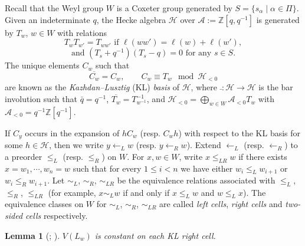 \documentclass[11pt, reqno]{amsart}
\newcommand{\al}{\alpha}
\newcommand{\mc}[1]{\mathcal{#1}}
\newcommand{\rar}{\rightarrow}
\newtheorem{lem}[Thm]{Lemma}
\theoremstyle{definition}
\numberwithin{equation}{section}
\begin{document}
Recall that the Weyl group $ W  $ is a Coxeter group generated by $ S=\{s_\al\mid\al\in\Pi \} $. Given an indeterminate $q$, the Hecke algebra $ \mc{H} $ over $ \mathcal{A} :=\mathbb{Z}[q,q^{-1}]$ is generated by $ T_w $, $ w\in W $ with relations \[
T_wT_{w'}=T_{ww'} \text{ if }\ell(ww')=\ell(w)+\ell(w'),
\]
\[
\text{and }(T_s+q^{-1})(T_s-q)=0 \text{ for any }s\in S.
\]
The unique elements $ C_w $ such that
\[
\overline{C_w}=C_w,\qquad C_w\equiv T_w \mod{\mc{H}_{<0}}
\]
are known as the \textit{Kazhdan--Lusztig} (KL) \textit{basis} of $ \mc{H} $, where $ \bar{\,} :\mc{H}\rar\mc{H}$ is the bar involution such that $ \bar{q}=q^{-1} $, $ \overline{T_w} =T_{w^{-1}}^{-1}$, and $ \mc{H}_{<0}=\bigoplus_{w\in W}\mathcal{A}_{<0}T_w $ with $ \mathcal{A}_{<0}=q^{-1}\mathbb{Z}[q^{-1}] $.

If $ C_y $ occurs in the expansion of $ hC_w $ (resp. $C_wh$) with respect to the KL basis for some $ h\in\mc{H} $, then we write $ y\leftarrow_L w $ (resp. $ y\leftarrow_R w $). Extend $ \leftarrow_L $ (resp. $ \leftarrow_R $) to a preorder $ \leq_L $ (resp. $\leq _R$) on $ W $. For $x, w\in W$, write $x \leq_{LR} w$ if there exists $x=w_1, \cdots, w_n=w$ such that for every $1\leq i<n$ we have either $w_i\leq_L w_{i+1}$ or $w_i\leq_R w_{i+1}$. Let $\sim_{L}$, $\sim_{R}$, $\sim_{LR}$ be the equivalence relations associated with $\leq_L$, $\leq_R$, $\leq_{LR}$ (for example, $x\sim_{L}w$ if and only if $x\leq_L w$ and $w\leq_Lx$). The equivalence classes on $W$ for $\sim_L$, $\sim_R$, $\sim_{LR}$ are called \textit{left cells}, \textit{right cells} and \textit{two-sided cells} respectively. 

\begin{lem}[{\cite[Lem. 6.6]{Jo84}}; {\cite[Cor. 6.3]{BoB3}}]\label{constant}
$V(L_w)$ is constant on each KL right cell.	
\end{lem}
\end{document}

